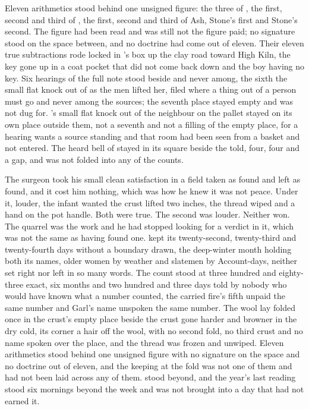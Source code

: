 Eleven arithmetics stood behind one unsigned figure: the three of , the first, second and third of , the first, second and third of Ash, Stone's first and Stone's second. The figure had been read and was still not the figure paid; no signature stood on the space between, and no doctrine had come out of eleven. Their eleven true subtractions rode locked in 's box up the clay road toward High Kiln, the key gone up in a coat pocket that did not come back down and the boy having no key. Six hearings of the full note stood beside and never among, the sixth the small flat knock out of  as the men lifted her, filed where a thing out of a person must go and never among the sources; the seventh place stayed empty and was not dug for. 's small flat knock out of the neighbour on the pallet stayed on its own place outside them, not a seventh and not a filling of the empty place, for a hearing wants a source standing and that room had been seen from a basket and not entered. The heard bell of  stayed in its square beside the told, four, four and a gap, and was not folded into any of the counts.

The surgeon took his small clean satisfaction in a field taken as found and left as found, and it cost him nothing, which was how he knew it was not peace. Under it, louder, the infant wanted the crust lifted two inches, the thread wiped and a hand on the pot handle. Both were true. The second was louder. Neither won. The quarrel was the work and he had stopped looking for a verdict in it, which was not the same as having found one.  kept its twenty-second, twenty-third and twenty-fourth days without a boundary drawn, the deep-winter month holding both its names, older women by weather and slatemen by Account-days, neither set right nor left in so many words. The count stood at three hundred and eighty-three exact, six months and two hundred and three days told by nobody who would have known what a number counted, the carried fire's fifth unpaid the same number and Garl's name unspoken the same number. The wool lay folded once in the crust's empty place beside the crust gone harder and browner in the dry cold, its corner a hair off the wool, with no second fold, no third crust and no name spoken over the place, and the thread was frozen and unwiped. Eleven arithmetics stood behind one unsigned figure with no signature on the space and no doctrine out of eleven, and the keeping at the fold was not one of them and had not been laid across any of them.  stood beyond, and the year's last reading stood six mornings beyond the week and was not brought into a day that had not earned it.

